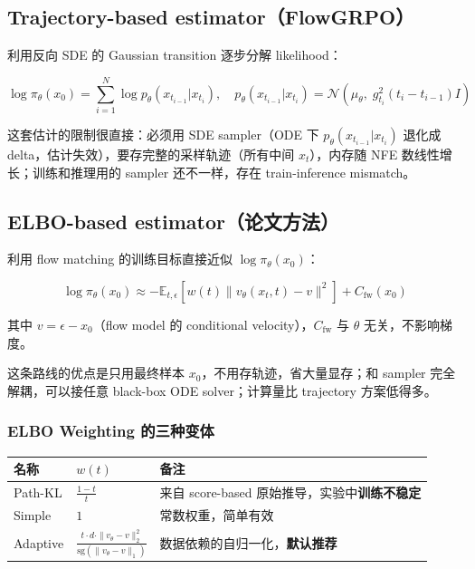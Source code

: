 \subsection{Trajectory-based estimator（FlowGRPO）}

利用反向 SDE 的 Gaussian transition 逐步分解 likelihood：

\[
\log \pi_\theta(x_0) = \sum_{i=1}^N \log p_\theta(x_{t_{i-1}} | x_{t_i}), \quad
p_\theta(x_{t_{i-1}}|x_{t_i}) = \mathcal{N}\!\left(\mu_\theta,\; g_{t_i}^2(t_i - t_{i-1})I\right)
\]

这套估计的限制很直接：必须用 SDE sampler（ODE 下 \(p_\theta(x_{t_{i-1}}|x_{t_i})\) 退化成 delta，估计失效），要存完整的采样轨迹（所有中间 \(x_t\)），内存随 NFE 数线性增长；训练和推理用的 sampler 还不一样，存在 train-inference mismatch。

\subsection{ELBO-based estimator（论文方法）}

利用 flow matching 的训练目标直接近似 \(\log \pi_\theta(x_0)\)：

\[
\log \pi_\theta(x_0) \approx -\mathbb{E}_{t,\epsilon}\!\left[w(t)\|v_\theta(x_t, t) - v\|^2\right] + C_\mathrm{fw}(x_0)
\]

其中 \(v = \epsilon - x_0\)（flow model 的 conditional velocity），\(C_\mathrm{fw}\) 与 \(\theta\) 无关，不影响梯度。

这条路线的优点是只用最终样本 \(x_0\)，不用存轨迹，省大量显存；和 sampler 完全解耦，可以接任意 black-box ODE solver；计算量比 trajectory 方案低得多。

\subsubsection{ELBO Weighting 的三种变体}

\begin{center}
\begin{tabular}{lll}
\toprule
名称 & \(w(t)\) & 备注 \\
\midrule
Path-KL & \(\frac{1-t}{t}\) & 来自 score-based 原始推导，实验中\textbf{训练不稳定} \\
Simple & \(1\) & 常数权重，简单有效 \\
Adaptive & \(\frac{t \cdot d \cdot \|v_\theta - v\|_2^2}{\mathrm{sg}(\|v_\theta - v\|_1)}\) & 数据依赖的自归一化，\textbf{默认推荐} \\
\bottomrule
\end{tabular}
\end{center}

